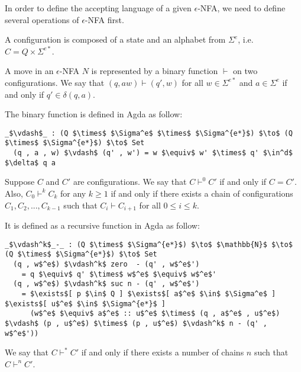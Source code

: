 \par In order to define the accepting language of a given
\(\epsilon\)-NFA, we need to define several operations of
\(\epsilon\)-NFA first. 

\begin{defn}
\noindent A configuration is composed of a state and an alphabet from
\(\Sigma^e\), i.e. \(C = Q \times \Sigma^{e*}\). 
\end{defn}

\begin{defn}
\noindent A move in an \(\epsilon\)-NFA \(N\) is
represented by a binary function \(\vdash\) on two configurations. We say
that \((q, aw) \vdash (q' , w)\) for all \(w \in \Sigma^{e*}\) and \(a \in \Sigma^e\)
 if and only if \(q' \in \delta (q , a)\). 
\end{defn}

\par The binary function is defined in Agda as follow: 
\begin{lstlisting}[mathescape=true]
  _$\vdash$_ : (Q $\times$ $\Sigma^e$ $\times$ $\Sigma^{e*}$) $\to$ (Q $\times$ $\Sigma^{e*}$) $\to$ Set
  (q , a , w) $\vdash$ (q' , w') = w $\equiv$ w' $\times$ q' $\in^d$ $\delta$ q a
\end{lstlisting}

\begin{defn}
\noindent Suppose \(C\) and \(C'\) are configurations. We say that \(C \vdash^0 C'\) if and only
if \(C = C'\). Also, \(C_0 \vdash^k C_k\) for any \(k \geq 1\) if and only if there exists a chain of
configurations \(C_1, C_2, ..., C_{k-1}\) such that \(C_i \vdash C_{i+1}\) for all \(0 \leq i \leq k\). 
\end{defn}

\par It is defined as a recursive function in Agda as follow: 
\begin{lstlisting}[mathescape=true]
  _$\vdash^k$_-_ : (Q $\times$ $\Sigma^{e*}$) $\to$ $\mathbb{N}$ $\to$ (Q $\times$ $\Sigma^{e*}$) $\to$ Set
  (q , w$^e$) $\vdash^k$ zero  - (q' , w$^e$')
    = q $\equiv$ q' $\times$ w$^e$ $\equiv$ w$^e$'
  (q , w$^e$) $\vdash^k$ suc n - (q' , w$^e$') 
    = $\exists$[ p $\in$ Q ] $\exists$[ a$^e$ $\in$ $\Sigma^e$ ] $\exists$[ u$^e$ $\in$ $\Sigma^{e*}$ ]
      (w$^e$ $\equiv$ a$^e$ :: u$^e$ $\times$ (q , a$^e$ , u$^e$) $\vdash$ (p , u$^e$) $\times$ (p , u$^e$) $\vdash^k$ n - (q' , w$^e$'))
\end{lstlisting}

\begin{defn}
\noindent We say that \(C \vdash^* C'\) if and only
if there exists a number of chains \(n\) such that \(C \vdash^n C'\). 
\end{defn}

